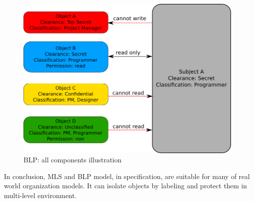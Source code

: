 \begin{figure}[bth]
\myfloatalign
\includegraphics[width=1.0\linewidth]{gfx/chapter_2/blp_example}
\caption[BLP: all components illustration]{BLP: all components illustration}
\label{fig:blp_full}
\end{figure}

In conclusion, MLS and BLP model, in specification, are suitable for many of real world organization models.
It can isolate objects by labeling and protect them in multi-level environment.
